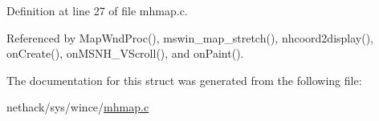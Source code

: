 Definition at line 27 of file mhmap.\+c.



Referenced by Map\+Wnd\+Proc(), mswin\+\_\+map\+\_\+stretch(), nhcoord2display(), on\+Create(), on\+M\+S\+N\+H\+\_\+\+V\+Scroll(), and on\+Paint().



The documentation for this struct was generated from the following file\+:\begin{DoxyCompactItemize}
\item 
nethack/sys/wince/\hyperlink{sys_2wince_2mhmap_8c}{mhmap.\+c}\end{DoxyCompactItemize}
